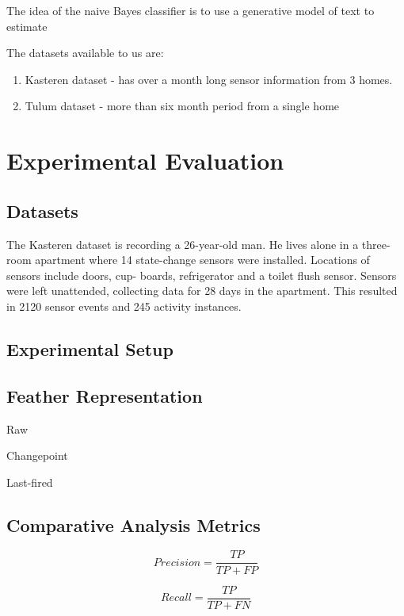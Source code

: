 \documentclass[11pt, oneside]{article}   	%
\begin{document}
The idea of the naive Bayes classifier is to use a generative model of text to estimate


The datasets available to us are:
	\begin{enumerate}
\item Kasteren dataset - has over a month long sensor information from 3 homes.
\item Tulum dataset - more than six month period from a single home
	\end{enumerate}


\section{Experimental Evaluation}

\subsection{Datasets}

The Kasteren dataset is recording a 26-year-old man. He lives alone in a three-room apartment where 14 state-change sensors were installed. Locations of sensors include doors, cup- boards, refrigerator and a toilet flush sensor. Sensors were left unattended, collecting data for 28 days in the apartment. This resulted in 2120 sensor events and 245 activity instances.


\subsection{Experimental Setup}

\subsection{Feather Representation}

 Raw

Changepoint

Last-fired


\subsection{Comparative Analysis Metrics}

\begin{equation}
Precision = \frac{TP}{TP+FP}
\end{equation}

\begin{equation}
Recall = \frac{TP}{TP+FN}
\end{equation}
\end{document}
